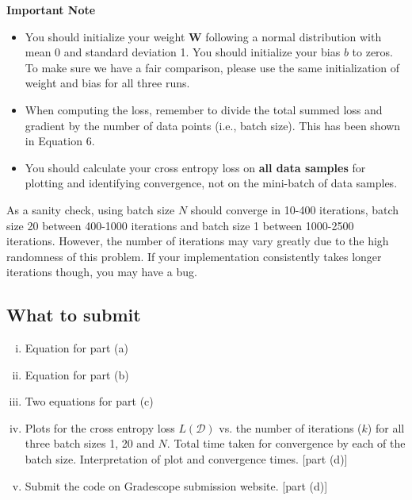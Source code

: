 \bigskip
\textbf{Important Note}
\begin{itemize}
    \item You should initialize your weight $\mathbf{W}$ following a normal distribution with mean 0 and standard deviation 1. You should initialize your bias $b$ to zeros. To make sure we have a fair comparison, please use the same initialization of weight and bias for all three runs. 
    \item When computing the loss, remember to divide the total summed loss and gradient by the number of data points (i.e., batch size). This has been shown in Equation 6.
    \item You should calculate your cross entropy loss on \textbf{all data samples} for plotting and identifying convergence, not on the mini-batch of data samples.
    
\end{itemize}
As a sanity check, using batch size $N$ should converge in 10-400 iterations, batch size 20 between 400-1000 iterations and batch size 1 between 1000-2500 iterations. However, the number of iterations may vary greatly due to the high randomness of this problem. If your implementation consistently takes longer iterations though, you may have a bug.


\subsection*{What to submit}
\begin{enumerate}[(i)]
	\item Equation for part (a)
	\item Equation for part (b)
	\item Two equations for part (c)
	\item Plots for the cross entropy loss $L(\mathcal{D})$ vs. the number of iterations ($k$) for all three batch sizes 1, 20 and $N$. Total time taken for convergence by each of the batch size.  Interpretation of plot and convergence times. [part (d)]
	\item Submit the code on Gradescope submission website. [part (d)]
\end{enumerate}


